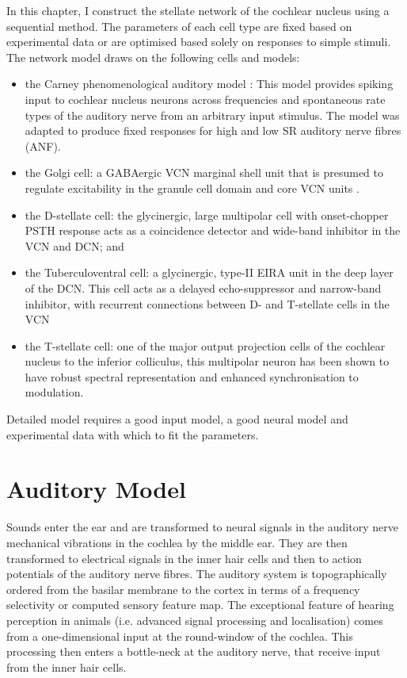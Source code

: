\medskip{}

In this chapter, I construct the stellate network of the cochlear
nucleus using a sequential method.  The parameters of each cell type
are fixed based on experimental data or are optimised based solely on
responses to simple stimuli. The network model draws on the following
cells and models:
\begin{itemize}
\item the Carney phenomenological auditory model
  \citet{ZilanyBruceEtAl:2009}: This model provides spiking input to
  cochlear nucleus neurons across frequencies and spontaneous rate
  types of the auditory nerve from an arbitrary input stimulus.  The
  model was adapted to produce fixed responses for high and low SR
  auditory nerve fibres (ANF).
\item the Golgi cell: a GABAergic VCN marginal shell unit that is
  presumed to regulate excitability in the granule cell domain and
  core VCN units \citep{FerragamoGoldingEtAl:1998}.
\item the D-stellate cell: the glycinergic, large multipolar cell with
  onset-chopper PSTH response acts as a co\-incidence detector and
  wide-band inhibitor in the VCN and DCN; and
\item the Tuberculo\-ventral cell: a glycinergic, type-II EIRA unit in
  the deep layer of the DCN.  This cell acts as a delayed
  echo-suppressor and narrow-band inhibitor, with recurrent
  connections between D- and T-stellate cells in the VCN
\item the T-stellate cell: one of the major output projection cells of
  the cochlear nucleus to the inferior colliculus, this multipolar
  neuron has been shown to have robust spectral representation and
  enhanced synchronisation to modulation.
\end{itemize}

\medskip{}

Detailed model requires a good input model, a good neural model and
experimental data with which to fit the parameters.  


\section{Auditory Model}

Sounds enter the ear and are transformed to neural signals in the
auditory nerve mechanical vibrations in the cochlea by the middle
ear.   They are then transformed to
electrical signals in the inner hair cells and then to action
potentials of the auditory nerve fibres. The auditory system is
topographically ordered from the basilar membrane to the cortex in
terms of a frequency selectivity or computed sensory feature map.  The
exceptional feature of hearing perception in animals (i.e. advanced
signal processing and localisation) comes from a one-dimensional input
at the round-window of the cochlea. This processing then enters a
bottle-neck at the auditory nerve, that receive input from the inner
hair cells.


